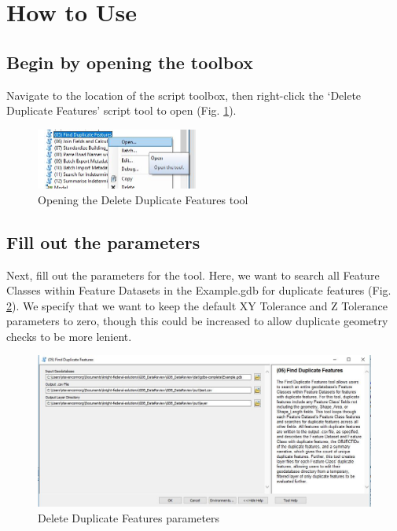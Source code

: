 \documentclass[openany]{book}
\theoremstyle{definition}
\theoremstyle{definition}
\theoremstyle{definition}
\theoremstyle{remark}
\begin{document}
\section{How to Use}\label{how-to-use-6}

\subsection{Begin by opening the
toolbox}\label{begin-by-opening-the-toolbox-6}

Navigate to the location of the script toolbox, then right-click the
`Delete Duplicate Features' script tool to open (Fig.
\ref{fig:delFopen}).

\begin{figure}[H]

{\centering \includegraphics[width=2.09in,]{figures/delF-opentool} 

}

\caption{Opening the Delete Duplicate Features tool}\label{fig:delFopen}
\end{figure}

\subsection{Fill out the parameters}\label{fill-out-the-parameters-6}

Next, fill out the parameters for the tool. Here, we want to search all
Feature Classes within Feature Datasets in the Example.gdb for duplicate
features (Fig. \ref{fig:delFparams}). We specify that we want to keep
the default XY Tolerance and Z Tolerance parameters to zero, though this
could be increased to allow duplicate geometry checks to be more
lenient.

\begin{figure}[H]

{\centering \includegraphics[width=0.8\linewidth,]{figures/delF-params} 

}

\caption{Delete Duplicate Features parameters}\label{fig:delFparams}
\end{figure}
\end{document}
